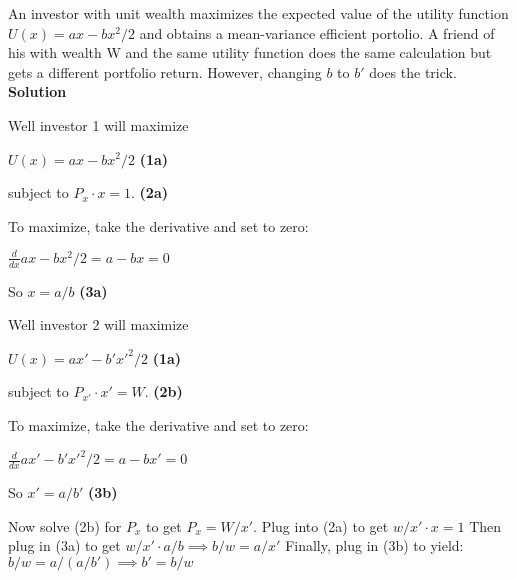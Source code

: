 \documentclass[12pt]{article}
\newenvironment{problem}[3][Problem]{\begin{trivlist}
\item[\hskip \labelsep {\bfseries #1}\hskip \labelsep {\bfseries #2.}]}{\end{trivlist}}
\newcommand{\ddx}{\frac{d}{dx}}
\begin{document}
\begin{problem}{9 Quadratic mean variance}. An investor with unit wealth maximizes the expected value of the utility function $U(x) = ax - bx^2/2 $ and obtains a mean-variance efficient portolio. A friend of his with wealth W and the same utility function does the same calculation but gets a different portfolio return. However, changing $b$ to $b'$ does the trick. \\
\textbf{Solution}
\begin{multicols}{2}
 Well investor 1 will maximize  
 
 $U(x) = ax - bx^2/2 $ \textbf{(1a)}
 
   subject to $P_x\cdot x =1$. \textbf{(2a)}
   
To maximize, take the derivative and set to zero:

$\ddx  ax - bx^2/2 = a-bx=0$

  So $x=a/b$  \textbf{(3a)}

  \columnbreak
 
     Well investor 2 will maximize  
 
 $U(x) = ax' - b'x'^2/2 $ \textbf{(1a)}
 
   subject to $P_{x'}\cdot x' =W$. \textbf{(2b)}
   
To maximize, take the derivative and set to zero:

$\ddx  ax' - b'x'^2/2 = a-bx'=0$

  So $x'=a/b'$ \textbf{(3b)}
\end{multicols}
Now solve (2b) for $P_x$ to get $P_x=W/x'$. Plug into (2a) to get $w/x'\cdot x = 1$ Then plug in (3a) to get $w/x' \cdot a/b  \implies b/w=a/x'$ Finally, plug in (3b) to yield: $b/w = a/(a/b') \implies b'=b/w$
\end{problem}
\end{document}
